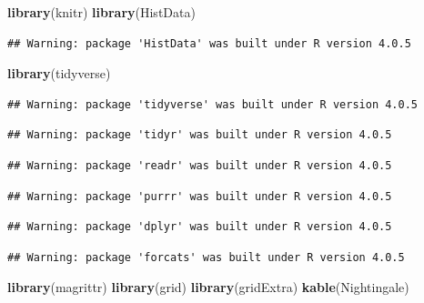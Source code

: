 \documentclass[
]{article}
\newenvironment{Shaded}{\begin{snugshade}}{\end{snugshade}}
\newcommand{\KeywordTok}[1]{\textcolor[rgb]{0.13,0.29,0.53}{\textbf{#1}}}
\newcommand{\NormalTok}[1]{#1}
\begin{document}
\begin{Shaded}
\begin{Highlighting}[]
\KeywordTok{library}\NormalTok{(knitr)}
\KeywordTok{library}\NormalTok{(HistData)}
\end{Highlighting}
\end{Shaded}

\begin{verbatim}
## Warning: package 'HistData' was built under R version 4.0.5
\end{verbatim}

\begin{Shaded}
\begin{Highlighting}[]
\KeywordTok{library}\NormalTok{(tidyverse)}
\end{Highlighting}
\end{Shaded}

\begin{verbatim}
## Warning: package 'tidyverse' was built under R version 4.0.5
\end{verbatim}

\begin{verbatim}
## Warning: package 'tidyr' was built under R version 4.0.5
\end{verbatim}

\begin{verbatim}
## Warning: package 'readr' was built under R version 4.0.5
\end{verbatim}

\begin{verbatim}
## Warning: package 'purrr' was built under R version 4.0.5
\end{verbatim}

\begin{verbatim}
## Warning: package 'dplyr' was built under R version 4.0.5
\end{verbatim}

\begin{verbatim}
## Warning: package 'forcats' was built under R version 4.0.5
\end{verbatim}

\begin{Shaded}
\begin{Highlighting}[]
\KeywordTok{library}\NormalTok{(magrittr)}
\KeywordTok{library}\NormalTok{(grid)}
\KeywordTok{library}\NormalTok{(gridExtra)}
\KeywordTok{kable}\NormalTok{(Nightingale)}
\end{Highlighting}
\end{Shaded}
\end{document}
